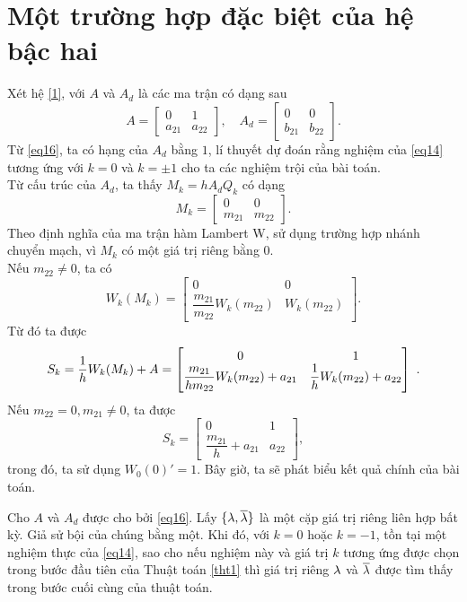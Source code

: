 \section{Một trường hợp đặc biệt của hệ bậc hai}\label{sec4}
Xét hệ \eqref{1}, với $A$ và $A_d$ là các ma trận có dạng sau
\begin{equation}\label{eq16}
	A= \begin{bmatrix}
		0 &1\\
		a_{21} &a_{22}
	\end{bmatrix}, \quad
	A_d= \begin{bmatrix}
		0 &0\\
		b_{21} &b_{22}
	\end{bmatrix}.
\end{equation}
Từ \eqref{eq16}, ta có hạng của $A_d$ bằng $1$, lí thuyết dự đoán rằng nghiệm của \eqref{eq14} tương ứng với $k =0$ và $k = \pm1$ cho ta các nghiệm trội của bài toán. \\
Từ cấu trúc của $A_d$, ta thấy $M_k = h  A_d Q_k$ có dạng
\begin{equation}\label{eq17}
	M_k = \begin{bmatrix}
		0 &0\\
		m_{21} &m_{22}
	\end{bmatrix}.
\end{equation}
Theo định nghĩa của ma trận hàm Lambert W, sử dụng trường hợp nhánh chuyển mạch, vì $M_k$ có một giá trị riêng bằng $0$.\\
Nếu $m_{22} \ne 0$, ta có
\begin{equation}\label{eq18}
	W_k(M_k)= \begin{bmatrix}
		0 &0\\
		\dfrac{	m_{21}}{m_{22}} W_k(m_{22}) &W_k(m_{22})
	\end{bmatrix}.
\end{equation}
Từ đó ta được
\begin{equation}\label{eq19}
	S_k = \dfrac{1}{h }W_k(M_k)+A = 
	\begin{bmatrix} 0 &1\\
		\dfrac{	m_{21}}{h  m_{22}} W_k(m_{22}) +a_{21} &\dfrac{1}{h }W_k(m_{22})+a_{22} \end{bmatrix}
	 \ .
\end{equation}
Nếu $m_{22}=0, m_{21} \ne 0$, ta được
\begin{equation}\label{eq20}
	S_k	= \begin{bmatrix}
		0 &1\\
		\dfrac{	m_{21}}{h } +a_{21} &a_{22}
	\end{bmatrix},
\end{equation}
trong đó, ta sử dụng $W_0 (0)' =1$. Bây giờ, ta sẽ phát biểu kết quả chính của bài toán.\\
%
\begin{dly}\label{dly21}
Cho $A$ và $A_d$ được cho bởi \eqref{eq16}. Lấy $\{ \lambda, \overline{\lambda}\}$ là một cặp giá trị riêng liên hợp bất kỳ. Giả sử bội của chúng bằng một. Khi đó, với $k =0$ hoặc $k =-1$, tồn tại một nghiệm thực của \eqref{eq14}, sao cho nếu nghiệm này và giá trị $k$ tương ứng được chọn trong bước đầu tiên của Thuật toán \ref{tht1} thì giá trị riêng $\lambda$ và $\overline{\lambda}$ được tìm thấy trong bước cuối cùng của thuật toán.
\end{dly}

